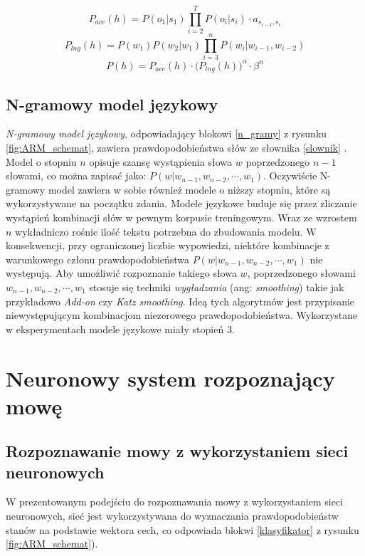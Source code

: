 \documentclass[shortabstract, mgr]{iithesis}
\newcommand{\refBlock}[1]{
	\hyperref[#1]{\ref*{#1}}
}
\begin{document}
		\begin{equation}
			P_{acc}(h) = P(o_1|s_1) \prod_{i=2}^T P(o_i|s_i) \cdot a_{s_{i-1},s_i}
		\end{equation}
		\begin{equation}
			P_{lng}(h) = P(w_1)P(w_2|w_1)\prod_{i=3}^nP(w_i|w_{i-1},w_{i-2})
		\end{equation}
		\begin{equation}
			P(h) = P_{acc}(h) \cdot \bigg(P_{lng}(h)\bigg)^\alpha \cdot \beta^n
		\label{eqn:h_score}
		\end{equation}
	
\section{N-gramowy model językowy}
	\label{sec:ngramm}
	\textit{N-gramowy model językowy}, odpowiadający blokowi \refBlock{n_gramy} z rysunku \ref{fig:ARM_schemat}, zawiera prawdopodobieństwa słów ze słownika \refBlock{slownik}. Model o stopniu $n$ opisuje szansę wystąpienia słowa $w$ poprzedzonego $n-1$ słowami, co można zapisać jako: $P(w|w_{n-1},w_{n-2},\cdots,w_1)$. Oczywiście N-gramowy model zawiera w sobie również modele o niższy stopniu, które są wykorzystywane na początku zdania. Modele językowe buduje się przez zliczanie wystąpień kombinacji słów w pewnym korpusie treningowym. Wraz ze wzrostem $n$ wykładniczo rośnie ilość tekstu potrzebna do zbudowania modelu. W konsekwencji, przy ograniczonej liczbie wypowiedzi, niektóre kombinacje z warunkowego członu prawdopodobieństwa  $P(w|w_{n-1},w_{n-2},\cdots,w_1)$ nie występują. Aby umożliwić rozpoznanie takiego słowa $w$, poprzedzonego słowami $w_{n-1},w_{n-2},\cdots,w_1$ stosuje się techniki \textit{wygładzania} (ang: \textit{smoothing}) takie jak przykładowo \textit{Add-on} czy \textit{Katz smoothing}. Ideą tych algorytmów jest przypisanie niewystępującym kombinacjom niezerowego prawdopodobieństwa. Wykorzystane w eksperymentach modele językowe miały stopień $3$.

\chapter{Neuronowy system rozpoznający mowę}
\section{Rozpoznawanie mowy z wykorzystaniem sieci neuronowych}
	\label{sec:ASR_NN}
	W prezentowanym podejściu do rozpoznawania mowy z wykorzystaniem sieci neuronowych, sieć jest wykorzystywana do wyznaczania prawdopodobieństw stanów na podstawie wektora cech, co odpowiada blokwi \refBlock{klasyfikator} z rysunku \ref{fig:ARM_schemat}).
	
\end{document}
